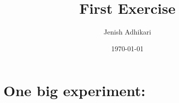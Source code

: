 \documentclass[a4]{scrartcl}
\title{First Exercise}
\author{Jenish Adhikari}
\date{\today}
\begin{document}
\maketitle
\tableofcontents

\section{One big experiment:}
\end{document}
